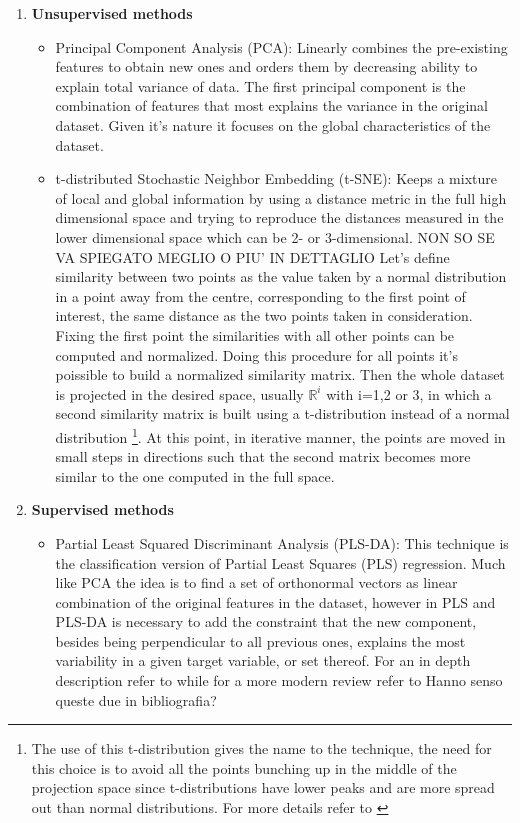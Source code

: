 \begin{enumerate}
\item \textbf{Unsupervised methods}
	\begin{itemize}
		\item Principal Component Analysis (PCA): Linearly combines the pre-existing features to obtain new ones and orders them by decreasing ability to explain total variance of data. The first principal component is the combination of features that most explains the variance in the original dataset. Given it's nature it focuses on the global characteristics of the dataset. 
		\item t-distributed Stochastic Neighbor Embedding (t-SNE): Keeps a mixture of local and global information by using a distance metric in the full high dimensional space and trying to reproduce the distances measured in the lower dimensional space which can be 2- or 3-dimensional. \large{NON SO SE VA SPIEGATO MEGLIO O PIU' IN DETTAGLIO}\newline
			Let's define similarity between two points as the value taken by a normal distribution in a point away from the centre, corresponding to the first point of interest, the same distance as the two points taken in consideration. Fixing the first point the similarities with all other points can be computed and normalized. Doing this procedure for all points it's poissible to build a normalized similarity matrix. Then the whole dataset is projected in the desired space, usually $\mathbb{R}^i$ with i=1,2 or 3, in which a second similarity matrix is built using a t-distribution instead of a normal distribution \footnote{The use of this t-distribution gives the name to the technique, the need for this choice is to avoid all the points bunching up in the middle of the projection space since t-distributions have lower peaks and are more spread out than normal distributions. For more details refer to \cite{t-sne}}. At this point, in iterative manner, the points are moved in small steps in directions such that the second matrix becomes more similar to the one computed in the full space.	
\end{itemize}

\item \textbf{Supervised methods}
	\begin{itemize}
	\item Partial Least Squared Discriminant Analysis (PLS-DA): This technique is the classification version of Partial Least Squares (PLS) regression. Much like PCA the idea is to find a set of orthonormal vectors as linear combination of the original features in the dataset, however in PLS and PLS-DA is necessary to add the constraint that the new component, besides being perpendicular to all previous ones, explains the most variability in a given target variable, or set thereof. For an in depth description refer to \cite{PLSDA} while for a more modern review refer to \cite{PLSDA_review} \large{Hanno senso queste due in bibliografia?}
	\end{itemize}


\end{enumerate}
